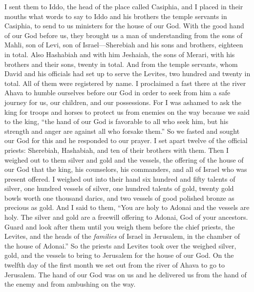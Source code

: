 \begin{biblechapter}
\verse I sent them to Iddo, the head of the place called Casiphia, and I placed in their mouths what words to say to Iddo and his brothers the temple servants in Casiphia, to send to us ministers for the house of our God.
\verse With the good hand of our God before us, they brought us a man of understanding from the sons of Mahli, son of Levi, son of Israel—Sherebiah and his sons and brothers, eighteen in total.
\verse Also Hashabiah and with him Jeshaiah, the sons of Merari, with his brothers and their sons, twenty in total.
\verse And from the temple servants, whom David and his officials had set up to serve the Levites, two hundred and twenty in total. All of them were registered by name.
 I proclaimed a fast there at the river Ahava to humble ourselves before our God in order to seek from him a safe journey for us, our children, and our possessions.
\verse For I was ashamed to ask the king for troops and horses to protect us from enemies on the way because we said to the king, “the hand of our God is favorable to all who seek him, but his strength and anger are against all who forsake them.”
\verse So we fasted and sought our God for this and he responded to our prayer.
 I set apart twelve of the official priests: Sherebiah, Hashabiah, and ten of their brothers with them.
\verse Then I weighed out to them silver and gold and the vessels, the offering of the house of our God that the king, his counselors, his commanders, and all of Israel who was present offered.
\verse I weighed out into their hand six hundred and fifty talents of silver, one hundred vessels of silver, one hundred talents of gold,
\verse twenty gold bowls worth one thousand darics, and two vessels of good polished bronze as precious as gold.
\verse And I said to them, “You are holy to Adonai and the vessels are holy. The silver and gold are a freewill offering to Adonai, God of your ancestors.
\verse Guard and look after them until you weigh them before the chief priests, the Levites, and the heads of the \textit{families} of Israel in Jerusalem, in the chamber of the house of Adonai.”
\verse So the priests and Levites took over the weighed silver, gold, and the vessels to bring to Jerusalem for the house of our God.
 On the twelfth day of the first month we set out from the river of Ahava to go to Jerusalem. The hand of our God was on us and he delivered us from the hand of the enemy and from ambushing on the way.

\end{biblechapter}
